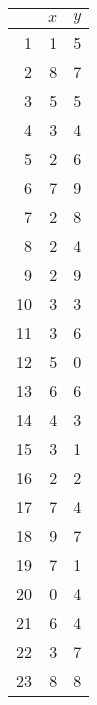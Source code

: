 \documentclass[11pt]{article}
\begin{document}
\begin{tabular}{r|rr}
	& $x$& $y$\\
	\hline
1	& 1	& 5	\\
2	& 8	& 7	\\
3	& 5	& 5	\\
4	& 3	& 4	\\
5	& 2	& 6	\\
6	& 7	& 9	\\
7	& 2	& 8	\\
8	& 2	& 4	\\
9	& 2	& 9	\\
10	& 3	& 3	\\
11	& 3	& 6	\\
12	& 5	& 0	\\
13	& 6	& 6	\\
14	& 4	& 3	\\
15	& 3	& 1	\\
16	& 2	& 2	\\
17	& 7	& 4	\\
18	& 9	& 7	\\
19	& 7	& 1	\\
20	& 0	& 4	\\
21	& 6	& 4	\\
22	& 3	& 7	\\
23	& 8	& 8	\\
\end{tabular}
\end{document}
